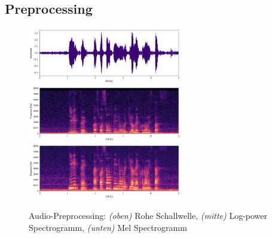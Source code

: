 \subsection{Preprocessing}
\begin{figure}[hbt]
	\centering
		\includegraphics[width=0.6\textwidth]{assets/audio_raw.png}
		\includegraphics[width=0.6\textwidth]{assets/audio_log.png}
		\includegraphics[width=0.6\textwidth]{assets/audio_mel.png}
	\centering
	\caption{Audio-Preprocessing: \textit{(oben)} Rohe Schallwelle, \textit{(mitte)}
		     Log-power Spectrogramm, 
		     \textit{(unten)} Mel Spectrogramm}
	\label{img:preprocessing}
\end{figure}